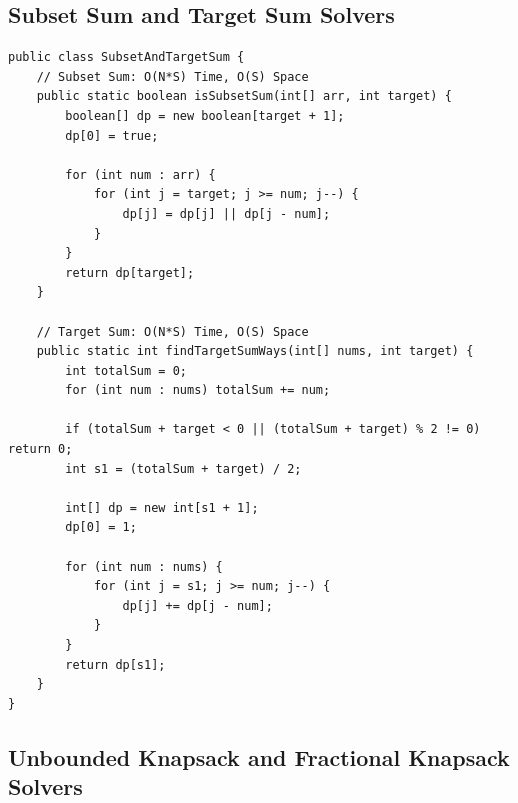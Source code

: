 \documentclass[10pt,journal,compsoc,onecolumn]{IEEEtran}
\begin{document}
\subsection{Subset Sum and Target Sum Solvers}

\begin{verbatim}
public class SubsetAndTargetSum {
    // Subset Sum: O(N*S) Time, O(S) Space
    public static boolean isSubsetSum(int[] arr, int target) {
        boolean[] dp = new boolean[target + 1];
        dp[0] = true;

        for (int num : arr) {
            for (int j = target; j >= num; j--) {
                dp[j] = dp[j] || dp[j - num];
            }
        }
        return dp[target];
    }

    // Target Sum: O(N*S) Time, O(S) Space
    public static int findTargetSumWays(int[] nums, int target) {
        int totalSum = 0;
        for (int num : nums) totalSum += num;

        if (totalSum + target < 0 || (totalSum + target) % 2 != 0) return 0;
        int s1 = (totalSum + target) / 2;

        int[] dp = new int[s1 + 1];
        dp[0] = 1;

        for (int num : nums) {
            for (int j = s1; j >= num; j--) {
                dp[j] += dp[j - num];
            }
        }
        return dp[s1];
    }
}
\end{verbatim}

\subsection{Unbounded Knapsack and Fractional Knapsack Solvers}
\end{document}
